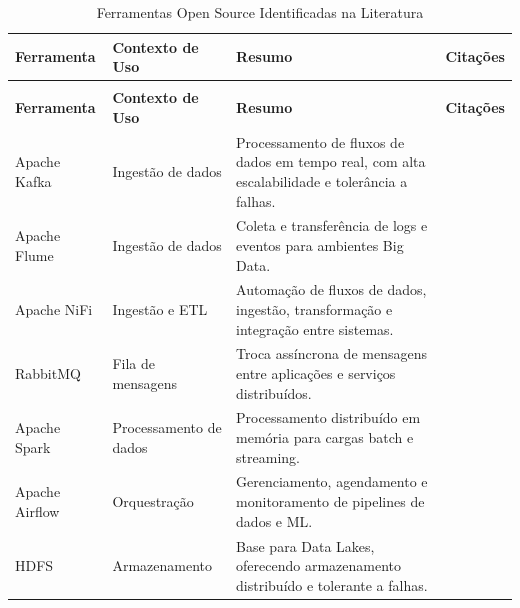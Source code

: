 \small
\setlength{\extrarowheight}{2pt}
\renewcommand{\arraystretch}{1.2}

\begin{longtable}{
    >{\raggedright\arraybackslash}p{2.8cm}
    >{\raggedright\arraybackslash}p{2.8cm}
    >{\raggedright\arraybackslash}p{6.2cm}
    >{\raggedright\arraybackslash}p{2.2cm}
}

\caption{Ferramentas Open Source Identificadas na Literatura}
\label{tab:ferramentas_open_source} \\

\toprule
\textbf{Ferramenta} &
\textbf{Contexto de Uso} &
\textbf{Resumo} &
\textbf{Citações} \\
\midrule
\endfirsthead

\multicolumn{4}{c}{\textit{Continuação da Tabela \ref{tab:ferramentas_open_source}}} \\
\toprule
\textbf{Ferramenta} &
\textbf{Contexto de Uso} &
\textbf{Resumo} &
\textbf{Citações} \\
\midrule
\endhead

\bottomrule
\endlastfoot

\rowcolor[gray]{0.96}
Apache Kafka &
Ingestão de dados &
Processamento de fluxos de dados em tempo real, com alta escalabilidade e tolerância a falhas. &
\cite[]{murarka2024, mbata2024survey} \\

Apache Flume &
Ingestão de dados &
Coleta e transferência de logs e eventos para ambientes Big Data. &
\cite[]{murarka2024} \\

\rowcolor[gray]{0.96}
Apache NiFi &
Ingestão e ETL &
Automação de fluxos de dados, ingestão, transformação e integração entre sistemas. &
\cite[]{murarka2024, mbata2024survey} \\

RabbitMQ &
Fila de mensagens &
Troca assíncrona de mensagens entre aplicações e serviços distribuídos. &
\cite[]{septian2019} \\

\rowcolor[gray]{0.96}
Apache Spark &
Processamento de dados &
Processamento distribuído em memória para cargas batch e streaming. &
\cite[]{murarka2024, septian2019, mbata2024survey} \\

Apache Airflow &
Orquestração &
Gerenciamento, agendamento e monitoramento de pipelines de dados e ML. &
\cite[]{mbata2024survey} \\

\rowcolor[gray]{0.96}
HDFS &
Armazenamento &
Base para Data Lakes, oferecendo armazenamento distribuído e tolerante a falhas. &
\cite[]{murarka2024, septian2019} \\


\end{longtable}
